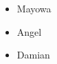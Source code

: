 \documentclass{article}
\begin{document}
	
		\begin{itemize}
			\item Mayowa
			\item Angel
			\item Damian
		\end{itemize}
	
\end{document}
